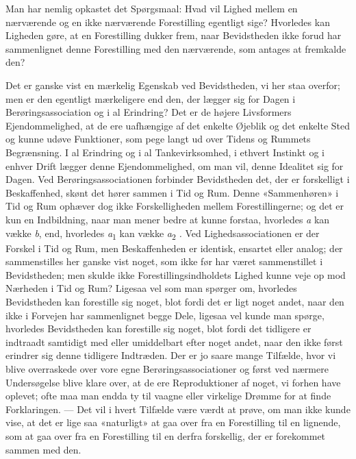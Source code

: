 \documentclass[12pt,a4paper,openany]{book}
\newcommand{\opage}[1]{\marginnote{\footnotesize\textit{[#1]}}}
\begin{document}
Man har nemlig opkastet det Spørgsmaal: Hvad vil Lighed mellem en nærværende og
en ikke nærværende Forestilling egentligt sige? Hvorledes kan Ligheden gøre, at
en Forestilling dukker frem, naar Bevidstheden ikke forud har sammenlignet
denne Forestilling med den nærværende, som antages at fremkalde den?

Det er ganske vist en mærkelig Egenskab ved Bevidstheden, vi her staa overfor;
men er den egentligt mærkeligere end den, der lægger sig for Dagen i
Berøringsassociation og i al Erindring? Det er de højere Livsformers
Ejendommelighed, at de ere uafhængige af det enkelte Øjeblik og det enkelte
Sted og kunne udøve Funktioner, som pege langt ud
\setcounter{footnote}{0}%
\opage{53}over Tidens og Rummets Begrænsning. I al Erindring og i al
Tankevirksomhed, i ethvert Instinkt og i enhver Drift lægger denne
Ejendommelighed, om man vil, denne Idealitet sig for Dagen. Ved
Berøringsassociationen forbinder Bevidstheden det, der er forskelligt i
Beskaffenhed, skønt det hører sammen i Tid og Rum. Denne «Sammenhøren» i Tid og
Rum ophæver dog ikke Forskelligheden mellem Forestillingerne; og det er kun en
Indbildning, naar man mener bedre at kunne forstaa, hvorledes \textit{a} kan
vække \textit{b}, end, hvorledes \textit{a}\textsubscript{1} kan vække
\textit{a}\textsubscript{2} \textit{.} Ved Lighedsassociationen er der Forskel
i Tid og Rum, men Beskaffenheden er identisk, ensartet eller analog; der
sammenstilles her ganske vist noget, som ikke før har været sammenstillet i
Bevidstheden; men skulde ikke Forestillingsindholdets Lighed kunne veje op mod
Nærheden i Tid og Rum? Ligesaa vel som man spørger om, hvorledes Bevidstheden
kan forestille sig noget, blot fordi det er ligt noget andet, naar den ikke i
Forvejen har sammenlignet begge Dele, ligesaa vel kunde man spørge, hvorledes
Bevidstheden kan forestille sig noget, blot fordi det tidligere er indtraadt
samtidigt med eller umiddelbart efter noget andet, naar den ikke først erindrer
sig denne tidligere Indtræden. Der er jo saare mange Tilfælde, hvor vi blive
overraskede over vore egne Berøringsassociationer og først ved nærmere
Undersøgelse blive klare over, at de ere Reproduktioner af noget, vi forhen
have oplevet; ofte maa man endda ty til vaagne eller virkelige Drømme for at
finde Forklaringen. --- Det vil i hvert Tilfælde være værdt at prøve, om man
ikke kunde vise, at det er lige saa «naturligt» at gaa over fra en Forestilling
til en lignende, som at gaa over fra en Forestilling til en derfra forskellig,
der er forekommet sammen med den.
\end{document}
